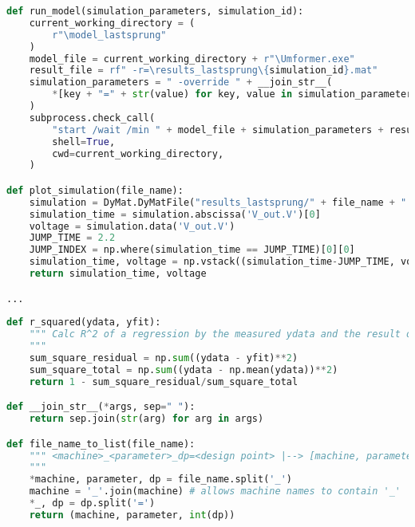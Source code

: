 \begin{lstlisting}[language=python, caption=Auszug aus \texttt{modelicaSweep.py}, label=lst:ModelicaSweep,frame=single,framerule=0pt]
def run_model(simulation_parameters, simulation_id):
    current_working_directory = (
        r"\model_lastsprung"
    )
    model_file = current_working_directory + r"\Umformer.exe"
    result_file = rf" -r=\results_lastsprung\{simulation_id}.mat"
    simulation_parameters = " -override " + __join_str__(
        *[key + "=" + str(value) for key, value in simulation_parameters.items()], sep=""
    )
    subprocess.check_call(
        "start /wait /min " + model_file + simulation_parameters + result_file,
        shell=True,
        cwd=current_working_directory,
    )

def plot_simulation(file_name):
    simulation = DyMat.DyMatFile("results_lastsprung/" + file_name + ".mat")
    simulation_time = simulation.abscissa('V_out.V')[0]
    voltage = simulation.data('V_out.V')
    JUMP_TIME = 2.2
    JUMP_INDEX = np.where(simulation_time == JUMP_TIME)[0][0]
    simulation_time, voltage = np.vstack((simulation_time-JUMP_TIME, voltage))[:,JUMP_INDEX:] # Combine both arrays to slice them with only one command
    return simulation_time, voltage

...
    
def r_squared(ydata, yfit):
    """ Calc R^2 of a regression by the measured ydata and the result of the curve fitting yfit
    """
    sum_square_residual = np.sum((ydata - yfit)**2)
    sum_square_total = np.sum((ydata - np.mean(ydata))**2)
    return 1 - sum_square_residual/sum_square_total

def __join_str__(*args, sep=" "):
    return sep.join(str(arg) for arg in args)

def file_name_to_list(file_name):
    """ <machine>_<parameter>_dp=<design point> |--> [machine, parameter, design point]
    """
    *machine, parameter, dp = file_name.split('_')
    machine = '_'.join(machine) # allows machine names to contain '_'
    *_, dp = dp.split('=')
    return (machine, parameter, int(dp))
\end{lstlisting}

